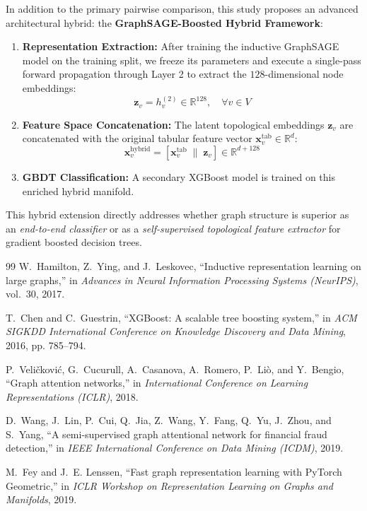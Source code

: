 \documentclass[11pt,a4paper]{article}
\begin{document}
In addition to the primary pairwise comparison, this study proposes an advanced architectural hybrid: the \textbf{GraphSAGE-Boosted Hybrid Framework}:
\begin{enumerate}[leftmargin=*]
    \item \textbf{Representation Extraction:} After training the inductive GraphSAGE model on the training split, we freeze its parameters and execute a single-pass forward propagation through Layer 2 to extract the $128$-dimensional node embeddings:
    \begin{equation}
    \mathbf{z}_v = h_v^{(2)} \in \mathbb{R}^{128}, \quad \forall v \in V
    \end{equation}
    \item \textbf{Feature Space Concatenation:} The latent topological embeddings $\mathbf{z}_v$ are concatenated with the original tabular feature vector $\mathbf{x}_v^{\text{tab}} \in \mathbb{R}^d$:
    \begin{equation}
    \mathbf{x}_v^{\text{hybrid}} = \left[ \mathbf{x}_v^{\text{tab}} \;\Big\|\; \mathbf{z}_v \right] \in \mathbb{R}^{d + 128}
    \end{equation}
    \item \textbf{GBDT Classification:} A secondary XGBoost model is trained on this enriched hybrid manifold.
\end{enumerate}
This hybrid extension directly addresses whether graph structure is superior as an \textit{end-to-end classifier} or as a \textit{self-supervised topological feature extractor} for gradient boosted decision trees.

\begin{thebibliography}{99}
W.~Hamilton, Z.~Ying, and J.~Leskovec, ``Inductive representation learning on large graphs,'' in \textit{Advances in Neural Information Processing Systems (NeurIPS)}, vol.~30, 2017.

T.~Chen and C.~Guestrin, ``XGBoost: A scalable tree boosting system,'' in \textit{ACM SIGKDD International Conference on Knowledge Discovery and Data Mining}, 2016, pp. 785--794.

P.~Veli{\v{c}}kovi{\'{c}}, G.~Cucurull, A.~Casanova, A.~Romero, P.~Li{\`{o}}, and Y.~Bengio, ``Graph attention networks,'' in \textit{International Conference on Learning Representations (ICLR)}, 2018.

D.~Wang, J.~Lin, P.~Cui, Q.~Jia, Z.~Wang, Y.~Fang, Q.~Yu, J.~Zhou, and S.~Yang, ``A semi-supervised graph attentional network for financial fraud detection,'' in \textit{IEEE International Conference on Data Mining (ICDM)}, 2019.

M.~Fey and J.~E. Lenssen, ``Fast graph representation learning with PyTorch Geometric,'' in \textit{ICLR Workshop on Representation Learning on Graphs and Manifolds}, 2019.
\end{thebibliography}
\end{document}
